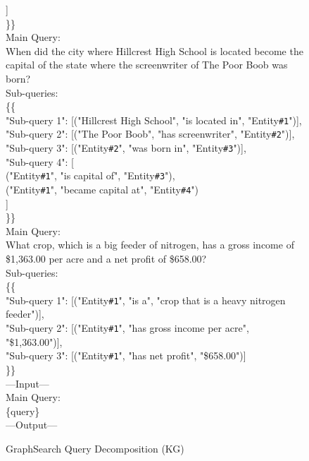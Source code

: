 \begin{figure}[t]
\begin{tcolorbox}[mybluebox, width=\textwidth, title={Query Decomposition (Knowledge Graph)}]
]\\
\}\}\\[4pt]
Main Query:\\
When did the city where Hillcrest High School is located become the capital of the state where the screenwriter of The Poor Boob was born?\\
Sub-queries:\\
\{\{\\
"Sub-query 1": [("Hillcrest High School", "is located in", "Entity\texttt{\#1}")],\\
"Sub-query 2": [("The Poor Boob", "has screenwriter", "Entity\texttt{\#2}")],\\
"Sub-query 3": [("Entity\texttt{\#2}", "was born in", "Entity\texttt{\#3}")],\\
"Sub-query 4": [\\
("Entity\texttt{\#1}", "is capital of", "Entity\texttt{\#3}"),\\
("Entity\texttt{\#1}", "became capital at", "Entity\texttt{\#4}")\\
]\\
\}\}\\[4pt]
Main Query:\\
What crop, which is a big feeder of nitrogen, has a gross income of \$1,363.00 per acre and a net profit of \$658.00?\\
Sub-queries:\\
\{\{\\
"Sub-query 1": [("Entity\texttt{\#1}", "is a", "crop that is a heavy nitrogen feeder")],\\
"Sub-query 2": [("Entity\texttt{\#1}", "has gross income per acre", "\$1,363.00")],\\
"Sub-query 3": [("Entity\texttt{\#1}", "has net profit", "\$658.00")]\\
\}\}\\[4pt]
---Input---\\
Main Query:\\
\{query\}\\[2pt]
---Output---
\end{tcolorbox}
\caption{GraphSearch Query Decomposition (KG)}
\end{figure}

